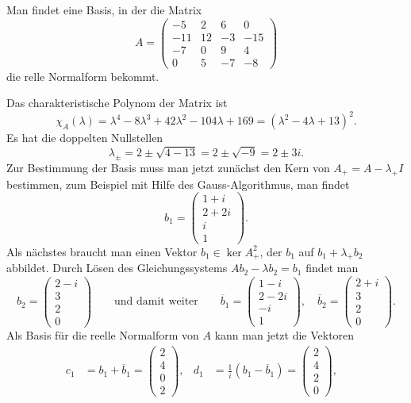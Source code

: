 Man findet eine Basis, in der die Matrix
\[
A=\begin{pmatrix}
 -5&  2&  6&   0\\
-11& 12& -3& -15\\
 -7&  0&  9&   4\\
  0&  5& -7&  -8
\end{pmatrix}
\]
die relle Normalform bekommt.

\begin{loesung}
Das charakteristische Polynom der Matrix ist 
\[
\chi_{A}(\lambda)
=
\lambda^4-8\lambda^3+42\lambda^2-104\lambda+169
=
(\lambda^2-4\lambda+13)^2.
\]
Es hat die doppelten Nullstellen
\[
\lambda_\pm
=
2\pm \sqrt{4-13}
=
2\pm \sqrt{-9}
=
2\pm 3i.
\]
Zur Bestimmung der Basis muss man jetzt zunächst den Kern von 
$A_+=A-\lambda_+I$ bestimmen, zum Beispiel mit Hilfe des Gauss-Algorithmus,
man findet
\[
b_1
=
\begin{pmatrix}
1+i\\
2+2i\\
i\\
1
\end{pmatrix}.
\]
Als nächstes braucht man einen Vektor $b_1\in \ker A_+^2$, der 
$b_1$ auf $b_1+\lambda_+b_2$ abbildet.
Durch Lösen des Gleichungssystems $Ab_2-\lambda b_2=b_1$ findet man
\[
b_2
=
\begin{pmatrix}
2-i\\3\\2\\0
\end{pmatrix}
\qquad\text{und damit weiter}\qquad
\overline{b}_1
=
\begin{pmatrix}
1-i\\
2-2i\\
-i\\
1
\end{pmatrix},\quad
\overline{b}_2
=
\begin{pmatrix}
2+i\\3\\2\\0
\end{pmatrix}.
\]
Als Basis für die reelle Normalform von $A$ kann man jetzt die Vektoren
\begin{align*}
c_1
&=
b_1+\overline{b}_1 = \begin{pmatrix}2\\4\\0\\2\end{pmatrix},&
d_1
&=
\frac{1}{i}(b_1-\overline{b}_1) = \begin{pmatrix}2\\4\\2\\0\end{pmatrix},&

\end{align*}
\end{loesung}
